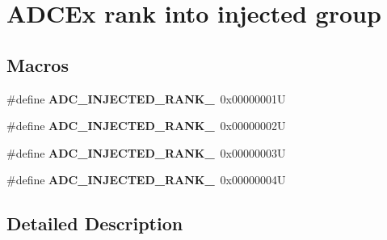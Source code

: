 \hypertarget{group___a_d_c_ex__injected__rank}{}\section{A\+D\+C\+Ex rank into injected group}
\label{group___a_d_c_ex__injected__rank}
\subsection*{Macros}
\begin{DoxyCompactItemize}
\item 
\mbox{\label{group___a_d_c_ex__injected__rank_gabe6252325fda6b22c794ea7b0e974ee3}} 
\#define {\bfseries A\+D\+C\+\_\+\+I\+N\+J\+E\+C\+T\+E\+D\+\_\+\+R\+A\+N\+K\+\_}~0x00000001U
\item 
\mbox{\label{group___a_d_c_ex__injected__rank_gaf065faf92e099a1667694233384d187e}} 
\#define {\bfseries A\+D\+C\+\_\+\+I\+N\+J\+E\+C\+T\+E\+D\+\_\+\+R\+A\+N\+K\+\_}~0x00000002U
\item 
\mbox{\label{group___a_d_c_ex__injected__rank_ga5fa8c3014caccae280220fd3df5d7f23}} 
\#define {\bfseries A\+D\+C\+\_\+\+I\+N\+J\+E\+C\+T\+E\+D\+\_\+\+R\+A\+N\+K\+\_}~0x00000003U
\item 
\mbox{\label{group___a_d_c_ex__injected__rank_gaffe7c5042c696b39ef23fba9af5a88b9}} 
\#define {\bfseries A\+D\+C\+\_\+\+I\+N\+J\+E\+C\+T\+E\+D\+\_\+\+R\+A\+N\+K\+\_}~0x00000004U
\end{DoxyCompactItemize}


\subsection{Detailed Description}

